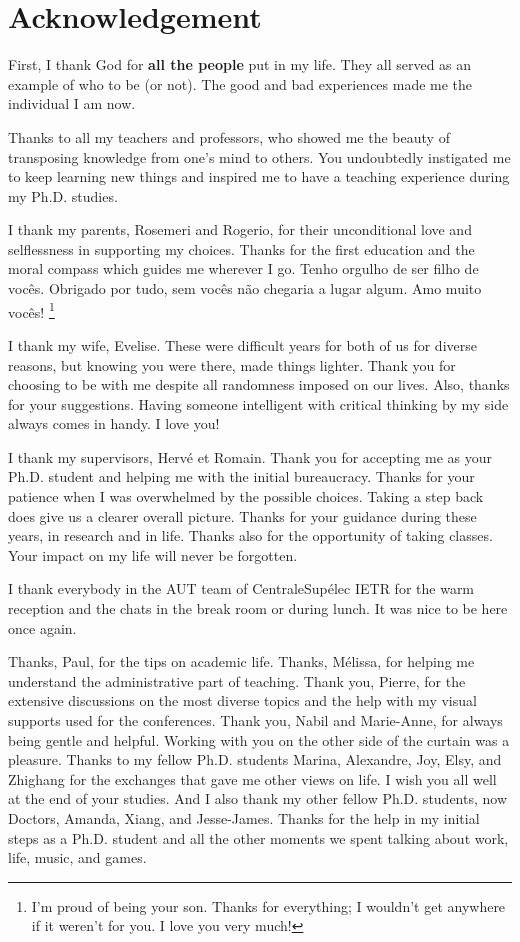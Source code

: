\documentclass[../main.tex]{subfiles}
\begin{document}
\chapter*{Acknowledgement}

First, I thank God for \textbf{all the people} put in my life.
They all served as an example of who to be (or not).
The good and bad experiences made me the individual I am now.

Thanks to all my teachers and professors, who showed me the beauty of transposing knowledge from one's mind to others.
You undoubtedly instigated me to keep learning new things and inspired me to have a teaching experience during my Ph.D. studies.

I thank my parents, Rosemeri and Rogerio, for their unconditional love and selflessness in supporting my choices.
Thanks for the first education and the moral compass which guides me wherever I go. Tenho orgulho de ser filho de vocês. Obrigado por tudo, sem vocês não chegaria a lugar algum. Amo muito vocês! \footnote{I'm proud of being your son. Thanks for everything; I wouldn't get anywhere if it weren't for you. I love you very much!}

I thank my wife, Evelise.
These were difficult years for both of us for diverse reasons, but knowing you were there, made things lighter.
Thank you for choosing to be with me despite all randomness imposed on our lives.
Also, thanks for your suggestions. Having someone intelligent with critical thinking by my side always comes in handy.
I love you!

I thank my supervisors, Hervé et Romain.
Thank you for accepting me as your Ph.D. student and helping me with the initial bureaucracy.
Thanks for your patience when I was overwhelmed by the possible choices.
Taking a step back does give us a clearer overall picture.
Thanks for your guidance during these years, in research and in life.
Thanks also for the opportunity of taking classes.
Your impact on my life will never be forgotten.

I thank everybody in the AUT team of CentraleSupélec IETR for the warm reception and the chats in the break room or during lunch. It was nice to be here once again.

Thanks, Paul, for the tips on academic life.
Thanks, Mélissa, for helping me understand the administrative part of teaching.
Thank you, Pierre, for the extensive discussions on the most diverse topics and the help with my visual supports used for the conferences.
Thank you, Nabil and Marie-Anne, for always being gentle and helpful. Working with you on the other side of the curtain was a pleasure.
Thanks to my fellow Ph.D. students Marina, Alexandre, Joy, Elsy, and Zhighang for the exchanges that gave me other views on life.
I wish you all well at the end of your studies.
And I also thank my other fellow Ph.D. students, now Doctors, Amanda, Xiang, and Jesse-James.
Thanks for the help in my initial steps as a Ph.D. student and all the other moments we spent talking about work, life, music, and games.
\end{document}
